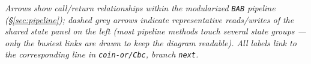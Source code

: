 \documentclass[10pt]{article}
\begin{document}
\begin{landscape}
\begin{center}
{\begin{tikzpicture}
\end{tikzpicture}%
}
\end{center}

\vspace{-3pt}
{\scriptsize\textit{Arrows show call/return relationships within the modularized \texttt{BAB} pipeline
(\S\ref{sec:pipeline}); dashed grey arrows indicate representative reads/writes of the shared state
panel on the left (most pipeline methods touch several state groups --- only the busiest links are
drawn to keep the diagram readable). All labels link to the corresponding line in
\texttt{coin-or/Cbc}, branch \texttt{next}.}}
\end{landscape}
\end{document}
